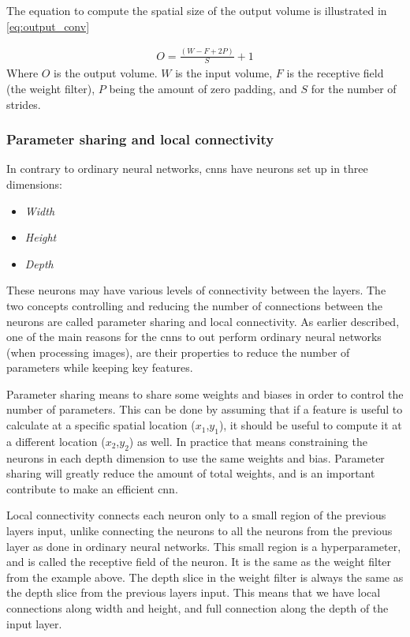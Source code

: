 \documentclass[USenglish]{ifimaster}  %
\begin{document}
The equation to compute the spatial size of the output volume is illustrated in \cref{eq:output_conv}

\begin{equation}\label{eq:output_conv}
\begin{aligned}
O = \frac{(W - F + 2P)}{S}+1
\end{aligned}
\end{equation}
Where $O$ is the output volume. $W$ is the input volume, $F$ is the receptive field (the weight filter), $P$ being the amount of zero padding, and $S$ for the number of strides.
 
\subsubsection{Parameter sharing and local connectivity}
In contrary to ordinary neural networks, \acp{cnn} have neurons set up in three dimensions:
\begin{itemize}
    \item \textit{Width}
    \item \textit{Height}
    \item \textit{Depth}
\end{itemize}
These neurons may have various levels of connectivity between the layers. The two concepts controlling and reducing the number of connections between the neurons are called parameter sharing and local connectivity. As earlier described, one of the main reasons for the \acp{cnn} to out perform ordinary neural networks (when processing images), are their properties to reduce the number of parameters while keeping key features. 

Parameter sharing means to share some weights and biases in order to control the number of parameters. This can be done by assuming that if a feature is useful to calculate at a specific spatial location ($x_1$,$y_1$), it should be useful to compute it at a different location ($x_2$,$y_2$) as well. In practice that means constraining the neurons in each depth dimension to use the same weights and bias. Parameter sharing will greatly reduce the amount of total weights, and is an important contribute to make an efficient \ac{cnn}. 

Local connectivity connects each neuron only to a small region of the previous layers input, unlike connecting the neurons to all the neurons from the previous layer as done in ordinary neural networks.
This small region is a hyperparameter, and is called the receptive field of the neuron. It is the same as the weight filter from the example above. The depth slice in the weight filter is always the same as the depth slice from the previous layers input. This means that we have local connections along width and height, and full connection along the depth of the input layer.
\end{document}
